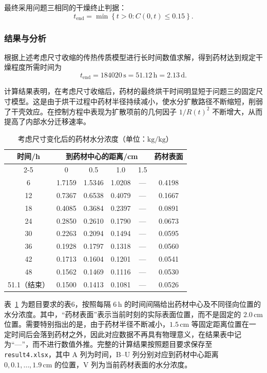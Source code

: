 \documentclass[12pt,a4paper]{article}
\begin{document}
最终采用问题三相同的干燥终止判据：
\begin{equation}
t_{\mathrm{end}}
=
\min
\left\{
t>0:
C(0,t)
\le0.15
\right\}.
\label{eq:end4}
\end{equation}

\subsubsection{结果与分析}

根据上述考虑尺寸收缩的传热传质模型进行长时间数值求解，得到药材达到规定干燥程度所需时间为
\begin{equation}
t_{\mathrm{end}}
=
184020\,\mathrm{s}
=
51.12\,\mathrm{h}
=
2.13\,\mathrm{d}.
\label{eq:result4}
\end{equation}

计算结果表明，在考虑尺寸收缩后，药材的最终烘干时间明显短于问题三的固定尺寸模型。这是由于烘干过程中药材半径持续减小，使水分扩散路径不断缩短，削弱了干壳效应。在控制方程中表现为扩散项前的几何因子 \(1/R(t)^2\) 不断增大，从而提高了内部水分迁移速率。

\begin{table}[htbp]
\centering
\caption{考虑尺寸变化后的药材水分浓度（单位：\(\mathrm{kg/kg}\)）}
\label{tab:moist4}
\renewcommand{\arraystretch}{1.2}
\begin{tabular}{cccccc}
\toprule
时间/h & \multicolumn{4}{c}{到药材中心的距离/cm} & 药材表面 \\
\cmidrule(lr){2-5}
 & 0 & 0.5 & 1.0 & 1.5 & \\
\midrule
6  & 1.7159 & 1.5346 & 1.0208 & — & 0.4198 \\
12 & 0.7367 & 0.6538 & 0.4079 & — & 0.1667 \\
18 & 0.4085 & 0.3684 & 0.2397 & — & 0.0891 \\
24 & 0.2850 & 0.2610 & 0.1790 & — & 0.0673 \\
30 & 0.2263 & 0.2094 & 0.1494 & — & 0.0595 \\
36 & 0.1928 & 0.1797 & 0.1318 & — & 0.0560 \\
42 & 0.1713 & 0.1604 & 0.1201 & — & 0.0541 \\
48 & 0.1562 & 0.1469 & 0.1116 & — & 0.0530 \\
51.1（结束）& 0.1500 & 0.1413 & 0.1081 & — & 0.0526 \\
\bottomrule
\end{tabular}
\end{table}

表~\ref{tab:moist4} 为题目要求的表6，按照每隔 \(6\,\mathrm{h}\) 的时间间隔给出药材中心及不同径向位置的水分浓度。其中，“药材表面”表示当前时刻的实际表面位置，而不是固定的 \(2.0\,\mathrm{cm}\) 位置。需要特别指出的是，由于药材半径不断减小，\(1.5\,\mathrm{cm}\) 等固定距离位置在一定时间后会落到药材之外，因此对应数据不再具有物理意义，在结果表中记为“—”，而不进行数值外推。完整的计算结果按照题目要求保存至 \texttt{result4.xlsx}，其中 A 列为时间，B--U 列分别对应到药材中心距离 \(0,0.1,\ldots,1.9\,\mathrm{cm}\) 的位置，V 列为当前药材表面的水分浓度。
\end{document}
